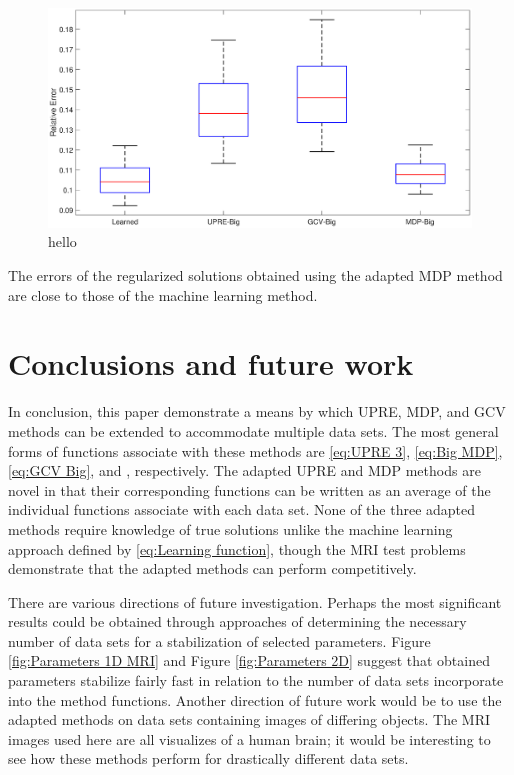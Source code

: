 \documentclass[12pt]{article}
\begin{document}
\begin{figure}[ht]
\includegraphics[scale=0.36]{Figures/Errors2D_mri}
\caption{hello}
\label{fig:Errors 2D}
\end{figure}
The errors of the regularized solutions obtained using the adapted MDP method are close to those of the machine learning method.

\section{Conclusions and future work} \label{sec:Conclusion}
In conclusion, this paper demonstrate a means by which UPRE, MDP, and GCV methods can be extended to accommodate multiple data sets. The most general forms of functions associate with these methods are \eqref{eq:UPRE 3}, \eqref{eq:Big MDP}, \eqref{eq:GCV Big}, and , respectively. The adapted UPRE and MDP methods are novel in that their corresponding functions can be written as an average of the individual functions associate with each data set. None of the three adapted methods require knowledge of true solutions unlike the machine learning approach defined by \eqref{eq:Learning function}, though the MRI test problems demonstrate that the adapted methods can perform competitively. \par
There are various directions of future investigation. Perhaps the most significant results could be obtained through approaches of determining the necessary number of data sets for a stabilization of selected parameters. Figure \ref{fig:Parameters 1D MRI} and Figure \ref{fig:Parameters 2D} suggest that obtained parameters stabilize fairly fast in relation to the number of data sets incorporate into the method functions. Another direction of future work would be to use the adapted methods on data sets containing images of differing objects. The MRI images used here are all visualizes of a human brain; it would be interesting to see how these methods perform for drastically different data sets.




\end{document}
